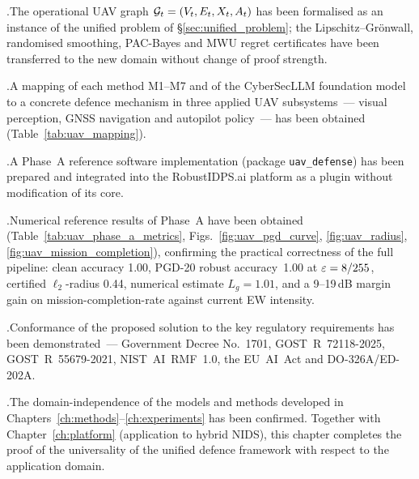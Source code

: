 .\quad The operational UAV graph
$\mathcal{G}_t = (V_t,E_t,X_t,A_t)$ has been formalised as an instance of
the unified problem of \S\ref{sec:unified_problem}; the
Lipschitz--Grönwall, randomised smoothing, PAC-Bayes and MWU regret
certificates have been transferred to the new domain without change
of proof strength.

.\quad A mapping of each method
\textsf{M1}--\textsf{M7} and of the \textsf{CyberSecLLM} foundation
model to a concrete defence mechanism in three applied UAV
subsystems~--- visual perception, GNSS navigation and autopilot
policy~--- has been obtained (Table~\ref{tab:uav_mapping}).

.\quad A Phase~A reference software implementation
(package \texttt{uav\_defense}) has been prepared and integrated into
the \textsf{RobustIDPS.ai} platform as a plugin without modification
of its core.

.\quad Numerical reference results of Phase~A have been
obtained (Table~\ref{tab:uav_phase_a_metrics},
Figs.~\ref{fig:uav_pgd_curve}, \ref{fig:uav_radius},
\ref{fig:uav_mission_completion}), confirming the practical
correctness of the full pipeline: clean accuracy 1.00, PGD-20 robust
accuracy~1.00 at $\varepsilon=8/255$, certified $\ell_2$-radius 0.44,
numerical estimate $L_g=1.01$, and a 9--19\,dB margin gain on
mission-completion-rate against current EW intensity.

.\quad Conformance of the proposed solution to the key
regulatory requirements has been demonstrated~--- Government Decree
No.~1701, \mbox{GOST~R~72118-2025}, \mbox{GOST~R~55679-2021},
\mbox{NIST~AI~RMF~1.0}, the \mbox{EU~AI~Act} and
\mbox{DO-326A/ED-202A}.

.\quad The domain-independence of the models and methods
developed in Chapters~\ref{ch:methods}--\ref{ch:experiments} has been
confirmed. Together with Chapter~\ref{ch:platform} (application to
hybrid NIDS), this chapter completes the proof of the universality of
the unified defence framework with respect to the application domain.
